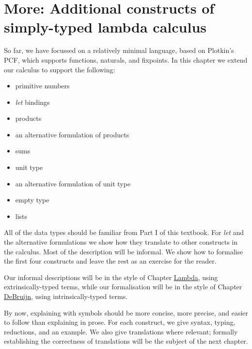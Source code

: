 \hypertarget{More}{%
\chapter{More: Additional constructs of simply-typed lambda
calculus}\label{More}}

\begin{fence}
\begin{code}%
\>[0]\AgdaSpace{}%
\AgdaSpace{}%
\<%
\end{code}
\end{fence}

So far, we have focussed on a relatively minimal language, based on
Plotkin's PCF, which supports functions, naturals, and fixpoints. In
this chapter we extend our calculus to support the following:

\begin{itemize}
\tightlist
\item
  primitive numbers
\item
  \emph{let} bindings
\item
  products
\item
  an alternative formulation of products
\item
  sums
\item
  unit type
\item
  an alternative formulation of unit type
\item
  empty type
\item
  lists
\end{itemize}

All of the data types should be familiar from Part I of this textbook.
For \emph{let} and the alternative formulations we show how they
translate to other constructs in the calculus. Most of the description
will be informal. We show how to formalise the first four constructs and
leave the rest as an exercise for the reader.

Our informal descriptions will be in the style of Chapter
\protect\hyperlink{Lambda}{Lambda}, using extrinsically-typed terms,
while our formalisation will be in the style of Chapter
\protect\hyperlink{DeBruijn}{DeBruijn}, using intrinsically-typed terms.

By now, explaining with symbols should be more concise, more precise,
and easier to follow than explaining in prose. For each construct, we
give syntax, typing, reductions, and an example. We also give
translations where relevant; formally establishing the correctness of
translations will be the subject of the next chapter.

